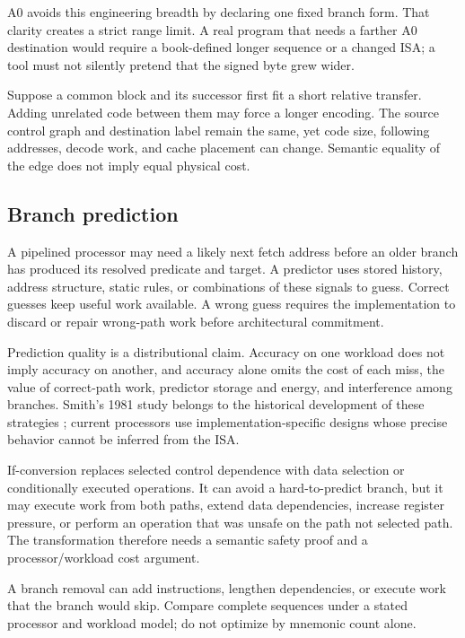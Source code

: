 A0 avoids this engineering breadth by declaring one fixed branch form. That
clarity creates a strict range limit. A real program that needs a farther A0
destination would require a book-defined longer sequence or a changed ISA; a
tool must not silently pretend that the signed byte grew wider.

\begin{example}[title={A semantically equal edge can cost more after layout}]
Suppose a common block and its successor first fit a short relative transfer.
Adding unrelated code between them may force a longer encoding. The source
control graph and destination label remain the same, yet code size, following
addresses, decode work, and cache placement can change. Semantic equality of
the edge does not imply equal physical cost.
\end{example}

\subsection{Branch prediction}

A pipelined processor may need a likely next fetch address before an older
branch has produced its resolved predicate and target. A predictor uses stored
history, address structure, static rules, or combinations of these signals to
guess. Correct guesses keep useful work available. A wrong guess requires the
implementation to discard or repair wrong-path work before architectural
commitment.

Prediction quality is a distributional claim. Accuracy on one workload does
not imply accuracy on another, and accuracy alone omits the cost of each miss,
the value of correct-path work, predictor storage and energy, and interference
among branches. Smith's 1981 study belongs to the historical development of
these strategies \autocite{smith1981branch}; current processors use
implementation-specific designs whose precise behavior cannot be inferred
from the ISA.

If-conversion replaces selected control dependence with data selection or
conditionally executed operations. It can avoid a hard-to-predict branch, but
it may execute work from both paths, extend data dependencies, increase
register pressure, or perform an operation that was unsafe on the path not selected
path. The transformation therefore needs a semantic safety proof and a
processor/workload cost argument.

\begin{warning}[title={Fewer branches does not automatically mean faster}]
A branch removal can add instructions, lengthen dependencies, or execute work
that the branch would skip. Compare complete sequences under a stated
processor and workload model; do not optimize by mnemonic count alone.
\end{warning}


